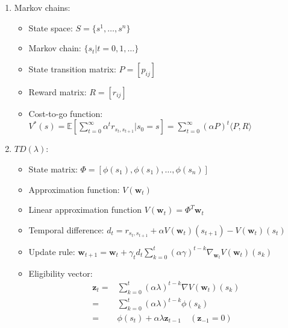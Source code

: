 \begin{enumerate}
    \item Markov chains:
        \begin{itemize}
            \item State space: $ S = \{s^1, \dots, s^n\} $
            \item Markov chain: $ \{ s_t | t = 0, 1, \dots \} $ 
            \item State transition matrix: $ P = [ p_{ij} ] $
            \item Reward matrix: $ R = [ r_{ij} ] $ 
            \item Cost-to-go function:
                $ V^*(s) = \mathbb{E}[ \sum^{\infty}_{t=0} \alpha^t r_{s_t, s_{t+1}} | s_0 = s ]
                = \sum^{\infty}_{t=0} {(\alpha P)}^t \langle P, R \rangle$ 
        \end{itemize}
    \item $TD(\lambda)$:
        \begin{itemize}
            \item State matrix: $ \Phi = [\phi(s_1), \phi(s_1), \dots, \phi(s_n) ]  $ 
            \item Approximation function: $ V( \mathbf{w}_t ) $ 
            \item Linear approximation function $ V( \mathbf{w}_t ) = \Phi^T \mathbf{w}_t $
            \item Temporal difference: $ d_t = r_{s_t, s_{t+1}} + \alpha V(\mathbf{w}_t)(s_{t+1})  - V(\mathbf{w}_t)(s_t) $ 
            \item Update rule:
                $ \mathbf{w}_{t+1} = \mathbf{w}_t + \gamma_t d_t
                \sum^{t}_{k=0} {(\alpha\gamma)}^{t-k} \nabla_{ \mathbf{w}_t} V( \mathbf{w}_t )(s_k) $ 
            \item Eligibility vector:
                \begin{equation}
                    \begin{aligned}
                        \mathbf{z}_t =& \sum^{t}_{k=0} {(\alpha\lambda)}^{t-k} \nabla V( \mathbf{w}_t )(s_k) \\
                        =&  \sum^{t}_{k=0} {(\alpha\lambda)}^{t-k} \phi(s_k) \\
                        =& \phi(s_{t}) + \alpha\lambda \mathbf{z}_{t-1}\quad ( \mathbf{z}_{-1} = 0 )
                    \end{aligned}
                \end{equation}
        \end{itemize}
\end{enumerate}

